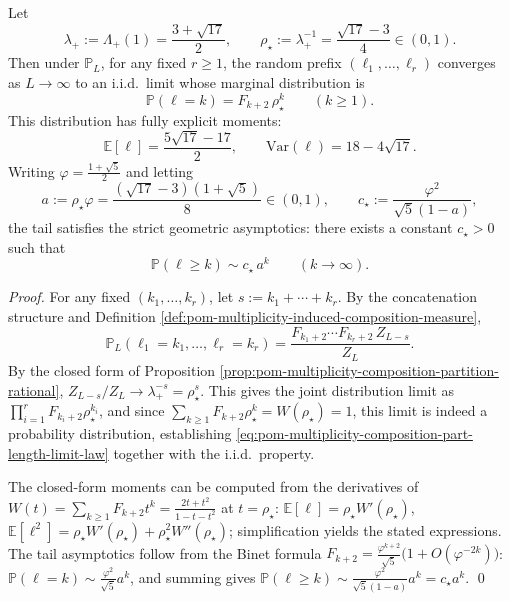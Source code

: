 \begin{proposition}\label{prop:pom-multiplicity-composition-part-length-iid-limit}
Let
\[
\lambda_+:=\Lambda_+(1)=\frac{3+\sqrt{17}}{2},
\qquad
\rho_\star:=\lambda_+^{-1}=\frac{\sqrt{17}-3}{4}\in(0,1).
\]
Then under \(\mathbb{P}_L\), for any fixed \(r\ge 1\), the random prefix \((\ell_1,\dots,\ell_r)\) converges as \(L\to\infty\) to an i.i.d.\ limit whose marginal distribution is
\begin{equation}\label{eq:pom-multiplicity-composition-part-length-limit-law}
\boxed{\;
\mathbb{P}(\ell=k)=F_{k+2}\,\rho_\star^{k}\qquad(k\ge 1).\;}
\end{equation}
This distribution has fully explicit moments:
\[
\boxed{\;
\mathbb{E}[\ell]=\frac{5\sqrt{17}-17}{2},\qquad
\mathrm{Var}(\ell)=18-4\sqrt{17}.\;}
\]
Writing \(\varphi=\frac{1+\sqrt5}{2}\) and letting
\[
a:=\rho_\star\varphi=\frac{(\sqrt{17}-3)(1+\sqrt5)}{8}\in(0,1),
\qquad
c_\star:=\frac{\varphi^2}{\sqrt5(1-a)},
\]
the tail satisfies the strict geometric asymptotics: there exists a constant \(c_\star>0\) such that
\[
\mathbb{P}(\ell\ge k)\sim c_\star\,a^{k}\qquad(k\to\infty).
\]
\end{proposition}
\begin{proof}
For any fixed \((k_1,\dots,k_r)\), let \(s:=k_1+\cdots+k_r\).
By the concatenation structure and Definition \ref{def:pom-multiplicity-induced-composition-measure},
\[
\mathbb{P}_L(\ell_1=k_1,\dots,\ell_r=k_r)
=\frac{F_{k_1+2}\cdots F_{k_r+2}\,Z_{L-s}}{Z_L}.
\]
By the closed form of Proposition \ref{prop:pom-multiplicity-composition-partition-rational},
\(
Z_{L-s}/Z_L\to \lambda_+^{-s}=\rho_\star^{s}
\).
This gives the joint distribution limit as \(\prod_{i=1}^r F_{k_i+2}\rho_\star^{k_i}\), and since
\(
\sum_{k\ge 1}F_{k+2}\rho_\star^k=W(\rho_\star)=1
\),
this limit is indeed a probability distribution, establishing \eqref{eq:pom-multiplicity-composition-part-length-limit-law} together with the i.i.d.\ property.
\par
The closed-form moments can be computed from the derivatives of \(W(t)=\sum_{k\ge 1}F_{k+2}t^k=\frac{2t+t^2}{1-t-t^2}\) at \(t=\rho_\star\):
\(
\mathbb{E}[\ell]=\rho_\star W'(\rho_\star)
\),
\(
\mathbb{E}[\ell^2]=\rho_\star W'(\rho_\star)+\rho_\star^2 W''(\rho_\star)
\); simplification yields the stated expressions.
The tail asymptotics follow from the Binet formula
\(
F_{k+2}=\frac{\varphi^{k+2}}{\sqrt5}\bigl(1+O(\varphi^{-2k})\bigr)
\):
\(
\mathbb{P}(\ell=k)\sim \frac{\varphi^2}{\sqrt5}a^{k}
\), and summing gives
\(
\mathbb{P}(\ell\ge k)\sim \frac{\varphi^2}{\sqrt5(1-a)}a^{k}=c_\star a^{k}
\). \qed
\end{proof}


